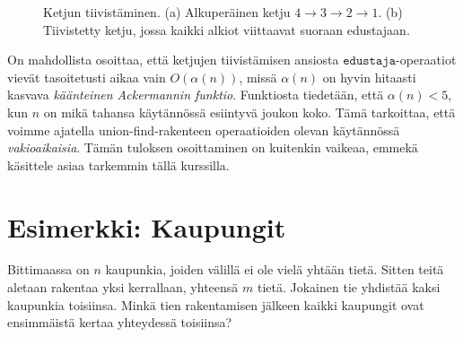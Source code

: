 \begin{figure}
\center
\begin{center}
\end{center}
\caption{Ketjun tiivistäminen. (a) Alkuperäinen ketju $4 \rightarrow 3 \rightarrow 2 \rightarrow 1$.
(b) Tiivistetty ketju, jossa kaikki alkiot viittaavat suoraan edustajaan.}
\label{fig:poltii}
\end{figure}

On mahdollista osoittaa, että ketjujen tiivistämisen ansiosta
$\texttt{edustaja}$-ope\-raatiot vievät tasoitetusti aikaa vain
$O(\alpha(n))$, missä $\alpha(n)$ on hyvin hitaasti kasvava
\emph{käänteinen Ackermannin funktio}.
Funktiosta tiedetään, että $\alpha(n)<5$, kun $n$ on mikä tahansa
käytännössä esiintyvä joukon koko.
Tämä tarkoittaa, että voimme ajatella union-find-rakenteen
operaatioiden olevan käytännössä \emph{vakioaikaisia}.
Tämän tuloksen osoittaminen on kuitenkin vaikeaa,
emmekä käsittele asiaa tarkemmin tällä kurssilla.

\section{Esimerkki: Kaupungit}

Bittimaassa on $n$ kaupunkia, joiden välillä ei ole vielä yhtään tietä.
Sitten teitä aletaan rakentaa yksi kerrallaan, yhteensä $m$ tietä.
Jokainen tie yhdistää kaksi kaupunkia toisiinsa.
Minkä tien rakentamisen jälkeen kaikki kaupungit ovat ensimmäistä
kertaa yhteydessä toisiinsa?

